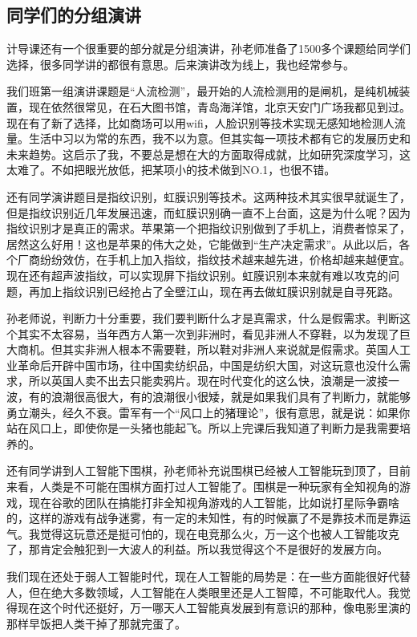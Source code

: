\documentclass{article}
\begin{document}
\subsection{同学们的分组演讲}
计导课还有一个很重要的部分就是分组演讲，孙老师准备了1500多个课题给同学们选择，很多同学讲的都很有意思。后来演讲改为线上，我也经常参与。\par 
我们班第一组演讲课题是“人流检测”，最开始的人流检测用的是闸机，是纯机械装置，现在依然很常见，在石大图书馆，青岛海洋馆，北京天安门广场我都见到过。现在有了新了选择，比如商场可以用wifi，人脸识别等技术实现无感知地检测人流量。生活中习以为常的东西，我不以为意。但其实每一项技术都有它的发展历史和未来趋势。这启示了我，不要总是想在大的方面取得成就，比如研究深度学习，这太难了。不如把眼光放低，把某项小的技术做到NO.1，也很不错。\par
还有同学演讲题目是指纹识别，虹膜识别等技术。这两种技术其实很早就诞生了，但是指纹识别近几年发展迅速，而虹膜识别确一直不上台面，这是为什么呢？因为指纹识别才是真正的需求。苹果第一个把指纹识别做到了手机上，消费者惊呆了，居然这么好用！这也是苹果的伟大之处，它能做到“生产决定需求”。从此以后，各个厂商纷纷效仿，在手机上加入指纹，指纹技术越来越先进，价格却越来越便宜。现在还有超声波指纹，可以实现屏下指纹识别。虹膜识别本来就有难以攻克的问题，再加上指纹识别已经抢占了全壁江山，现在再去做虹膜识别就是自寻死路。\par 
孙老师说，判断力十分重要，我们要判断什么才是真需求，什么是假需求。判断这个其实不太容易，当年西方人第一次到非洲时，看见非洲人不穿鞋，以为发现了巨大商机。但其实非洲人根本不需要鞋，所以鞋对非洲人来说就是假需求。英国人工业革命后开辟中国市场，往中国卖纺织品，中国是纺织大国，对这玩意也没什么需求，所以英国人卖不出去只能卖鸦片。现在时代变化的这么快，浪潮是一波接一波，有的浪潮很高很大，有的浪潮很小很矮，就是如果我们具有了判断力，就能够勇立潮头，经久不衰。雷军有一个“风口上的猪理论”，很有意思，就是说：如果你站在风口上，即使你是一头猪也能起飞。所以上完课后我知道了判断力是我需要培养的。\par 
还有同学讲到人工智能下围棋，孙老师补充说围棋已经被人工智能玩到顶了，目前来看，人类是不可能在围棋方面打过人工智能了。围棋是一种玩家有全知视角的游戏，现在谷歌的团队在搞能打非全知视角游戏的人工智能，比如说打星际争霸啥的，这样的游戏有战争迷雾，有一定的未知性，有的时候赢了不是靠技术而是靠运气。我觉得这玩意还是挺可怕的，现在电竞那么火，万一这个也被人工智能攻克了，那肯定会触犯到一大波人的利益。所以我觉得这个不是很好的发展方向。\par 
我们现在还处于弱人工智能时代，现在人工智能的局势是：在一些方面能很好代替人，但在绝大多数领域，人工智能在人类眼里还是人工智障，不可能取代人。我觉得现在这个时代还挺好，万一哪天人工智能真发展到有意识的那种，像电影里演的那样早饭把人类干掉了那就完蛋了。\par 
\end{document}
